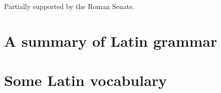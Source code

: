 \documentclass[twocolumn]{autart}    %
\begin{document}
\begin{ack}                               %
Partially supported by the Roman Senate.  %
\end{ack}




\appendix
\section{A summary of Latin grammar}    %
\section{Some Latin vocabulary}         %
\end{document}
